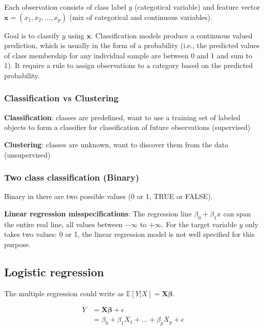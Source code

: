 \indent 

Each observation consists of class label $y$ (categotical variable) and feature vector $\boldsymbol{x} = (x_1,x_2,...,x_p)$ (mix of categorical and continuous variables).

Goal is to classify $y$ using $\boldsymbol{x}$. Classification models produce a continuous valued prediction, which is usually in the form of a probability (i.e., the predicted values of class membership for any individual sample are between 0 and 1 and sum to 1). It require a rule to assign observations to a category based on the predicted probability.

\subsubsection{Classification vs Clustering}

\indent 

\noindent\textbf{Classification}: classes are predefined, want to use a training set of labeled objects to form a classifier for classification of future observations (supervised)

\noindent\textbf{Clustering}: classes are unknown, want to discover them from the data (unsupervised)

\subsubsection{Two class classification (Binary)}

\indent 

Binary in there are two possible values (0 or 1, TRUE or FALSE).

\noindent\textbf{Linear regression misspecifications}: The regression line $\beta_0+\beta_1x$ can span the entire real line, all values between $-\infty$ to $+\infty$. For the target variable $y$ only takes two values: 0 or 1, the linear regression model is not well specified for this purpose.

\subsection{Logistic regression}

\indent 

The multiple regression could write as $\mathbb{E}[Y|X] = \boldsymbol{X\beta}$.

\begin{align*}
    Y & = \boldsymbol{X\beta}+\epsilon\\
     & = \beta_0 + \beta_1X_1+...+\beta_pX_p+\epsilon
\end{align*}

